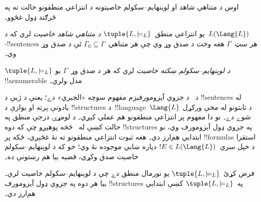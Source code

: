 \documentclass[../../../include/open-logic-section]{subfiles}
\begin{document}


اوس د متناهي شاهد او لوېنهايم--سکولم خاصيتونه د انتزاعي منطقونو حالت
ته په څرګند ډول غځوو۔

\begin{defn}
يو انتزاعي منطق~$\tuple{L, \models_L}$ \emph{د متناهي شاهد خاصيت}
لري که د~$L(\Lang{L})$-!!{sentence}s هر سټ~$\Gamma$ هغه وخت د صدق
وړ وي چې هر متناهي~$\Gamma_0 \subseteq \Gamma$ ئې د صدق وړ وي۔
\end{defn}

\begin{defn}
$\tuple{L, \models_L}$ \emph{د لوېنهايم--سکولم ښکته خاصيت} لري که
هر د صدق وړ~$\Gamma$ يو !!a{enumerable} مدل ولري۔
\end{defn}


د~ د جزوي آيزومورفيزم مفهوم سوچه
«الجبري» دے؛ يعنې د ژبې د !!{sentence}s له يادونې پرته او يوازې د
!!{structure}s د~!!{language}~$\Lang{L}$ د ثابتونو له مخې ورکړل شوے
دے۔ نو دا مفهوم پر انتزاعي منطقونو هم عملي کېږي۔ د لومړۍ درجې منطق
په حالت کښې له~ څخه پوهېږو چې که دوه
!!{structure}s په جزوي ډول آيزومورف وي، نو ابتدايي هم‌ارز دي۔ هغه
ثبوت انتزاعي منطقونو ته نۀ غځېږي، ځکه پر !!{formula}s استقرا د خپل
سري~$!E \in L(\Lang{L})$ دپاره ښايي موجوده نۀ وي؛ خو که د
لوېنهايم--سکولم خاصيت صدق وکړي، قضيه بيا هم رښتونې ده۔

\begin{thm}
فرض کړئ~$\tuple{L, \models_L}$ يو نورمال منطق دے چې د
لوېنهايم--سکولم خاصيت لري۔ بيا هر دوه په جزوي ډول آيزومورف
!!{structure}s په~$\tuple{L, \models_L}$ کښې ابتدايي هم‌ارز دي۔
\end{thm}
\end{document}
